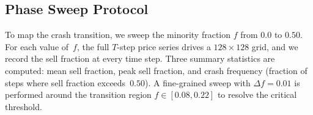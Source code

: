 \subsection{Phase Sweep Protocol}
\label{sec:phase-sweep}
To map the crash transition, we sweep the minority fraction $f$ from $0.0$ to $0.50$.
For each value of~$f$, the full $T$-step price series drives a $128 \times 128$ grid,
and we record the sell fraction at every time step. Three summary statistics are
computed: mean sell fraction, peak sell fraction, and crash frequency (fraction of
steps where sell fraction exceeds~$0.50$). A fine-grained sweep with
$\Delta f = 0.01$ is performed around the transition region $f \in [0.08, 0.22]$
to resolve the critical threshold.
